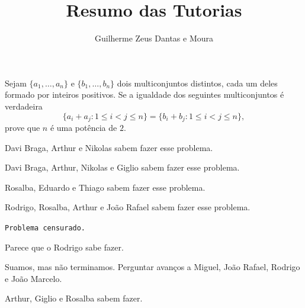 \documentclass[10pt,a4paper]{article}
\title{Resumo das Tutorias}
\author{Guilherme Zeus Dantas e Moura}
\begin{document}
	
 	\zeustitle

	\begin{prob}
		Sejam $\{a_1, \dots, a_n\}$ e $\{b_1, \dots,b_n\}$ dois multiconjuntos distintos, cada um deles formado por inteiros positivos.
		Se a igualdade dos seguintes multiconjuntos é verdadeira \[\{a_i+a_j: 1 \leq i<j \leq n\} = \{b_i+b_j: 1 \leq i<j \leq n\},\] prove que $n$ é uma potência de $2$.
	\end{prob}

	\begin{sk}
		Davi Braga, Arthur e Nikolas sabem fazer esse problema.
	\end{sk}


	\begin{sk}
		Davi Braga, Arthur, Nikolas e Giglio sabem fazer esse problema.
	\end{sk}

	\begin{sk}
		Rosalba, Eduardo e Thiago sabem fazer esse problema.
	\end{sk}

	\begin{sk}
		Rodrigo, Rosalba, Arthur e João Rafael sabem fazer esse problema.
	\end{sk}

	\begin{prob}
		\texttt{Problema censurado.}
	\end{prob}
	\begin{sk}
		Parece que o Rodrigo sabe fazer.
	\end{sk}

	\begin{sk}
		Suamos, mas não terminamos. Perguntar avanços a Miguel, João Rafael, Rodrigo e João Marcelo.
	\end{sk}

	\begin{sk}
		Arthur, Giglio e Rosalba sabem fazer.
	\end{sk}
\end{document}
